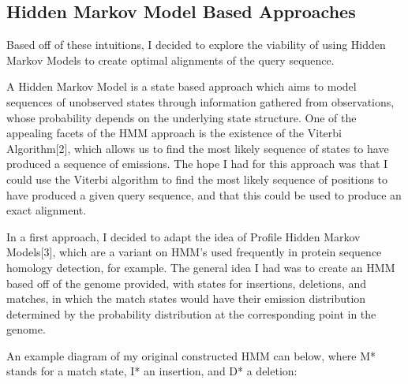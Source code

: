 \documentclass[12pt, conference]{IEEEtran}
\begin{document}
	\subsection{\textbf{Hidden Markov Model Based Approaches}}
	
	Based off of these intuitions, I decided to explore the viability of using Hidden Markov Models to create optimal alignments of the query sequence.
	
	A Hidden Markov Model is a state based approach which aims to model sequences of unobserved states through information gathered from observations, whose probability depends on the underlying state structure. One of the appealing facets of the HMM approach is the existence of the Viterbi Algorithm[2], which allows us to find the most likely sequence of states to have produced a sequence of emissions. The hope I had for this approach was that I could use the Viterbi algorithm to find the most likely sequence of positions to have produced a given query sequence, and that this could be used to produce an exact alignment.
	
	In a first approach, I decided to adapt the idea of Profile Hidden Markov Models[3], which are a variant on HMM's used frequently in protein sequence homology detection, for example. The general idea I had was to create an HMM based off of the genome provided, with states for insertions, deletions, and matches, in which the match states would have their emission distribution determined by the probability distribution at the corresponding point in the genome.
	
	An example diagram of my original constructed HMM can below, where M* stands for a match state, I* an insertion, and D* a deletion:
\end{document}

